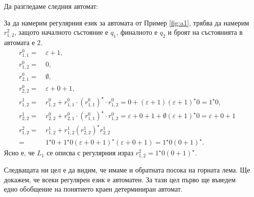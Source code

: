 \begin{example}
  \label{fig:a1}
  Да разгледаме следния автомат:
  
  \begin{figure}[H]
    \begin{center}
      \end{center}
 \end{figure}

 За да намерим регулярния език за автомата от Пример \ref{fig:a1}, 
 трябва да намерим $r^2_{1,2}$, защото началното състояние е $q_1$, финалното е $q_2$ и 
 броят на състоянията в автомата е $2$.
 \begin{align*}
   r^0_{1,1} =\ & \varepsilon + 1,\\
   r^0_{1,2} =\ & 0,\\
   r^0_{2,1} =\ & \emptyset,\\
   r^0_{2,2} =\ & \varepsilon +  0 + 1,\\
    r^1_{1,2} =\ & r^0_{1,2} + r^0_{1,1}\cdot(r^0_{1,1})^\star \cdot r^0_{1,2} = 0 + (\varepsilon + 1)(\varepsilon + 1)^\star0 = 1^\star0,\\
    r^1_{2,2} =\ & r^0_{2,2} + r^0_{2,1} \cdot (r^0_{1,1})^\star\cdot r^0_{1,2} = \varepsilon + 0 + 1 + \emptyset(\varepsilon + 1)^\star0 = \varepsilon + 0 + 1\\
    r^2_{1,2} =\ & r^{1}_{1,2} + r^{1}_{1,2}(r^1_{2,2})^\star r^1_{2,2} \\
    =\ & 1^\star0 + 1^\star0 (\varepsilon + 0 + 1)^\star (\varepsilon + 0 + 1) = 1^\star 0 (0 + 1)^\star.
  \end{align*}
Ясно е, че $L_1$ се описва с регулярния израз $r^2_{1,2} = 1^\star 0 (0 + 1)^\star$.
\end{example}

Следващата ни цел е да видим, че имаме и обратната посока на горната лема.
Ще докажем, че всеки регулярен език е автоматен. За тази цел първо ще 
въведем едно обобщение на понятието краен детерминиран автомат.

